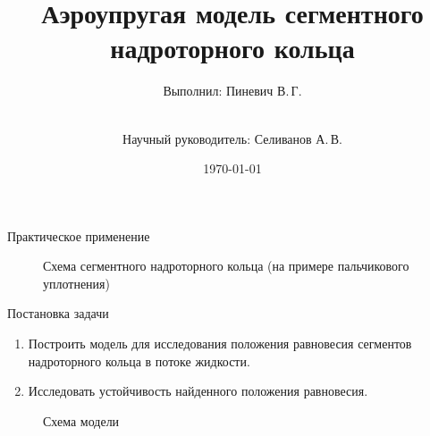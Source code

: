 \documentclass[ignoreonframetext,unicode]{beamer}
\title[Аэроупргугая модель]{Аэроупругая модель сегментного надроторного кольца}
\author[Пиневич В.\,Г.]{Выполнил: Пиневич В.\,Г.\and\\[0.5mm] Научный руководитель: Селиванов А.\,В.}
\institute[каф. Прикладная математика ФН-2]{группа ФН2-81Б}
\date{\today}
\begin{document}
	
	\begin{frame}[plain]
		\maketitle
	\end{frame}


	\begin{frame}{Практическое применение}
		\vspace*{-10mm}
		\begin{figure}[!htbp]
			\caption{Схема сегментного надроторного кольца (на примере пальчикового уплотнения)}
			\label{vved-2}
		\end{figure}
	\end{frame}

	\begin{frame}{Постановка задачи}
		\vspace*{2mm}
	\begin{enumerate}	
	\item Построить модель для исследования положения равновесия сегментов надроторного кольца в потоке жидкости.
	\item Исследовать устойчивость найденного положения равновесия.
\end{enumerate}
		
		\vspace*{-4mm}
	\begin{figure}[!htbp]
		\caption{Схема модели}
		\label{pruzina}
	\end{figure}	
		
	
		
	\end{frame}
\end{document}
